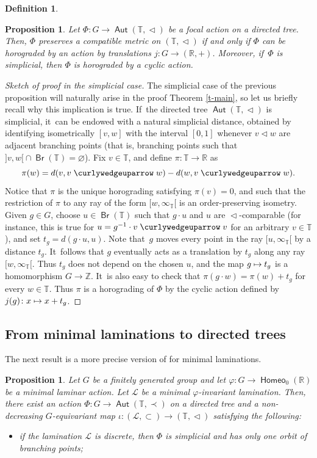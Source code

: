 \documentclass[JEP,XML,SOM,Unicode,NoFloatCountersInSection,published]{cedram}
\def\mto{\mathchoice{\longmapsto}{\mapsto}{\mapsto}{\mapsto}}
\newtheorem{prop}[thm]{Proposition}
\theoremstyle{definition}
\newtheorem{dfn}[thm]{Definition}
\DeclareMathOperator{\Aut}{\mathsf{Aut}}
\DeclareMathOperator{\Br}{\mathsf{Br}}
\DeclareMathOperator{\homeo}{\mathsf{Homeo}}
\newcommand{\R}{\mathbb{R}}
\newcommand{\Z}{\mathbb Z}
\newcommand{\Tbb}{\mathbb T}
\newcommand{\Lcal}{\mathcal{L}}
\newcommand{\treeorder}{\mathrel{\triangleleft}}
\newcommand{\treeup}{\mathrel{\curlywedgeuparrow}}
\begin{document}
\begin{dfn}
\begin{prop}\label{prop.Rtreemetric} Let $\Phi\colon G\to\Aut(\Tbb,\treeorder)$ be a focal action on a directed tree. Then, $\Phi $ preserves a compatible metric on $(\Tbb,\treeorder)$ if and only if $\Phi $ can be horograded by an action by translations $j\colon G\to (\R, +)$. Moreover, if~$\Phi $ is simplicial, then $\Phi $ is horograded by a cyclic action.
\end{prop}

\begin{proof}[Sketch of proof in the simplicial case]
The simplicial case of the previous proposition will naturally arise in the proof Theorem \ref{t-main}, so let us briefly recall why this implication is true. If~the directed tree $\Aut(\Tbb, \treeorder)$ is simplicial, it~can be endowed with a natural simplicial distance, obtained by identifying isometrically $[v, w]$ with the interval $[0, 1]$ whenever $v\treeorder w$ are adjacent branching points (that is, branching points such that $]v, w[{}\cap \Br(\Tbb)=\varnothing$). Fix $v\in\Tbb$, and define $\pi\colon\Tbb\to\R$ as
\[\pi(w)=d(v,v\treeup w)-d(w,v\treeup w).
\]
Notice that $\pi$ is the unique horograding satisfying $\pi(v)=0$, and such that the restriction of $\pi$ to any ray of the form $[w,\infty_\Tbb[$ is an order-preserving isometry.
Given $g\in G$, choose $u\in \Br(\Tbb)$ such that $g\cdot u$ and $u$ are $\treeorder$-comparable (for instance, this is true for $u=g^{-1}\cdot v \treeup v$ for an arbitrary $v\in \Tbb$), and set $t_g= d(g\cdot u, u)$. Note that~$g$ moves every point in the ray $[u, \infty_\Tbb[$ by a distance $t_g$. It~follows that $g$ eventually acts as a translation by $t_g$ along any ray $[w, \infty_\Tbb[$. Thus $t_g$ does not depend on the chosen $u$, and the map $g\mto t_g$ is a homomorphism $G\to \Z$. It~is also easy to check that
$\pi(g\cdot w)=\pi(w)+t_g$
for every $w\in \Tbb$. Thus $\pi$ is a horograding of $\Phi $ by the cyclic action defined by $j(g) \colon x\mto x+t_g$.\qedhere
\end{proof}

\subsection{From minimal laminations to directed trees}
\label{subsection trees}

The next result is a more precise version of \cite[Prop.\,11.2.3]{BMRT} for minimal laminations.

\begin{prop}\label{prop.minimalmodeltree} Let $G$ be a finitely generated group and let $\varphi\colon G\to\homeo_0(\R)$ be a minimal laminar action. Let $\Lcal$ be a minimal $\varphi$-invariant lamination. Then, there exist an action $\Phi\colon G\to\Aut(\Tbb,\prec)$ on a directed tree and a non-decreasing $G$-equivariant map $\iota \colon (\Lcal, \subset)\to (\Tbb, \treeorder)$ satisfying the following:
\begin{itemize}
\item if the lamination $\Lcal$ is discrete, then $\Phi $ is simplicial and has only one orbit of branching points;


\end{itemize}
\end{prop}
\end{dfn}
\end{document}
